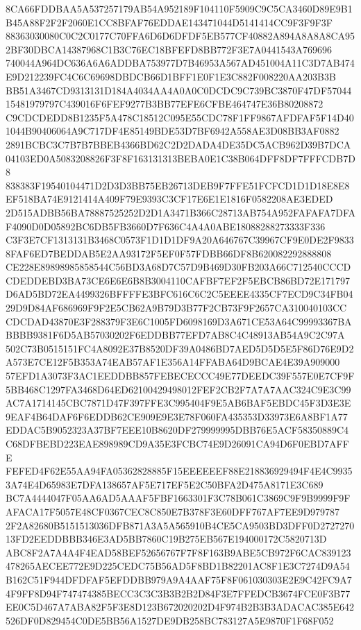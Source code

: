 \documentclass[UTF8,fontset=fandol,zihao=-4,a4paper]{ctexart}
\begin{document}
{{8CA66FDDBAA5A537257179AB54A952189F104110F5909C9C5CA3460D89E9B1B45A88F2F2F2060E1CC8BFAF76EDDAE143471044D5141414CC9F3F9F3F
88363030080C0C2C0177C70FFA6D6D6DFDF5EB577CF40882A894A8A8A8CA952BF30DBCA14387968C1B3C76EC18BFEFD8BB772F3E7A0441543A769696
740044A964DC636A6A6ADDBA753977D7B46953A567AD451004A11C3D7AB474E9D212239FC4C6C69698DBDCB66D1BFF1E0F1E3C882F008220AA203B3B
BB51A3467CD9313131D184A4034AA4A0A0C0DCDC9C739BC3870F47DF5704415481979797C439016F6FEF9277B3BB77EFE6CFBE464747E36B80208872
C9CDCDEDD8B1235F5A478C18512C095E55CDC78F1FF9867AFDFAF5F14D401044B90406064A9C717DF4E85149BDE53D7BF6942A558AE3D08BB3AF0882
2891BCBC3C7B7B7BBEB4366BD62C2D2DADA4DE35DC5ACB962D39B7DCA04103ED0A5083208826F3F8F163131313BEBA0E1C38B064DFF8DF7FFFCDB7D8
838383F19540104471D2D3D3BB75EB26713DEB9F7FFE51FCFCD1D1D18E8E8EF518BA74E9121414A409F79E9393C3CF17E6E1E1816F0582208AE3EDED
2D515ADBB56BA78887525252D2D1A3471B366C28713AB754A952FAFAFA7DFAF4090D0D05892BC6DB5FB3660D7F636C4A4A0ABE18088288273333F336
C3F3E7CF1313131B3468C0573F1D1D1DF9A20A646767C39967CF9E0DE2F98338FAF6ED7BEDDAB5E2AA93172F5EF0F57FDBB66DF8B620082292888808
CE228E89898985858544C56BD3A68D7C57D9B469D30FB203A66C712540CCCDCDEDDEBD3BA73CE6E6E6B8B3004110CAFBF7EF2F5EBCB86BD72E171797
D6AD5BD72EA4499326BFFFFE3BFC616C6C2C5EEEE4335CF7ECD9C34FB0429D9D84AF686969F9F2E5CB62A9B79D3B77F2CB73F9F2657CA310040103CC
CDCDAD43870E3F288379F3E6C1005FD6098169D3A671CE53A64C99993367BABBBB9381F6D5AB57030202F6EDDBB77EFD7AB8C4C48913AB54A9C2C97A
502C73B0515151FC4A8092E37B8520DF39A0486BD7AED5D5D5E5F86D76E9D2A573E7CE12F5B353A74EAB57AF1E356A14FFABA64D9BCAE4E39A909000
57EFD1A3073F3AC1EEDDBB857FEBECECCC49E77DEEDC39F557E0E7CF9F5BB468C1297FA3468D64ED62100429498012FEF2CB2F7A7A7AAC324C9E3C99
AC7A1714145CBC7871D47F397FFE3C995404F9E5AB6BAF5EBDC45F3D3E3E9EAF4B64DAF6F6EDDB62CE909E9E3E78F060FA435353D33973E6A8BF1A77
EDDAC5B9052323A37BF7EEE10B8620DF279999995DBB76E5ACF58350889C4C68DFBEBD223EAE898989CD9A35E3FCBC74E9D26091CA94D6F0EBD7AFFE
FEFED4F62E55AA94FA05362828885F15EEEEEEF88E218836929494F4E4C99353A74E4D65983E7DFA138657AF5E717EF5E2C50BFA2D475A8171E3C689
BC7A4444047F05AA6AD5AAAF5FBF1663301F3C78B061C3869C9F9B9999F9FAFACA17F5057E48CF0367CEC8C850E7B378F3E60DFF767AF7EE9D979787
2F2A82680B5151513036DFB871A3A5A565910B4CE5CA9503BD3DFF0D272727013FD2EEDDBBB346E3AD5BB7860C19B275EB567E194000172C5820713D
ABC8F2A7A4A4F4EAD58BEF52656767F7F8F163B9ABE5CB972F6CAC839123478265AECEE772E9D225CEDC75B56AD5F8BD1B82201AC8F1E3C7274D9A54
B162C51F944DFDFAF5EFDDBB979A9A4AAF75F8F061030303E2E9C42FC9A74F9FF8D94F747474385BECC3C3C3B3B2B2D84F3E7FFEDCB3674FCE0F3B77
EE0C5D467A7ABA82F5F3E8D123B672020202D4F974B2B3B3ADACAC385E642526DF0D829454C0DE5BB56A1527DE9DB258BC783127A5E9870F1F68F052
}}
\end{document}
